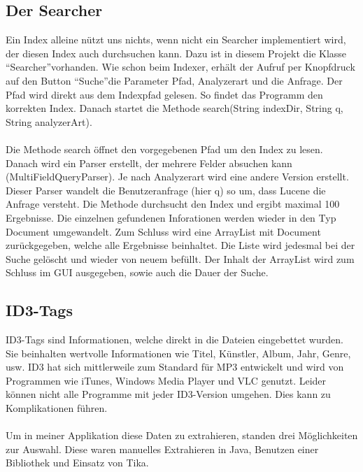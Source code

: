 \documentclass[12pt,a4paper,ngerman]{report}
\begin{document}
\subsection{Der Searcher}
Ein Index alleine nützt uns nichts, wenn nicht ein Searcher implementiert wird, der diesen Index auch durchsuchen kann. Dazu ist in diesem Projekt die Klasse \textquotedblleft Searcher\textquotedblright vorhanden. Wie schon beim Indexer, erhält der Aufruf per Knopfdruck auf den Button \textquotedblleft Suche\textquotedblright die Parameter Pfad, Analyzerart und die Anfrage. Der Pfad wird direkt aus dem Indexpfad gelesen. So findet das Programm den korrekten Index. Danach startet die Methode search(String indexDir, String q, String analyzerArt).\\
\\
Die Methode search öffnet den vorgegebenen Pfad um den Index zu lesen. Danach wird ein Parser erstellt, der mehrere Felder absuchen kann (MultiFieldQueryParser). Je nach Analyzerart wird eine andere Version erstellt. Dieser Parser wandelt die Benutzeranfrage (hier q) so um, dass Lucene die Anfrage versteht. Die Methode durchsucht den Index und ergibt maximal 100 Ergebnisse. Die einzelnen gefundenen Inforationen werden wieder in den Typ Document umgewandelt. Zum Schluss wird eine ArrayList mit Document zurückgegeben, welche alle Ergebnisse beinhaltet. Die Liste wird jedesmal bei der Suche gelöscht und wieder von neuem befüllt. Der Inhalt der ArrayList wird zum Schluss im GUI ausgegeben, sowie auch die Dauer der Suche.
\subsection{ID3-Tags}
ID3-Tags sind Informationen, welche direkt in die Dateien eingebettet wurden. Sie beinhalten wertvolle Informationen wie Titel, Künstler, Album, Jahr, Genre, usw. ID3 hat sich mittlerweile zum Standard für MP3 entwickelt und wird von Programmen wie iTunes, Windows Media Player und VLC genutzt. Leider können nicht alle Programme mit jeder ID3-Version umgehen. Dies kann zu Komplikationen führen.\\
\\
Um in meiner Applikation diese Daten zu extrahieren, standen drei Möglichkeiten zur Auswahl. Diese waren manuelles Extrahieren in Java, Benutzen einer Bibliothek und  Einsatz von Tika.
\end{document}
